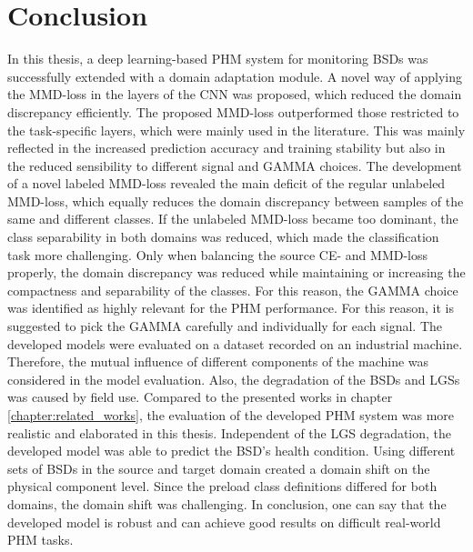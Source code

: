 \chapter{Conclusion}\label{chapter:conclusion}

In this thesis, a deep learning-based PHM system for monitoring BSDs was successfully extended with a domain adaptation module. A novel way of applying the MMD-loss in the layers of the CNN was proposed, which reduced the domain discrepancy efficiently. The proposed MMD-loss outperformed those restricted to the task-specific layers, which were mainly used in the literature. This was mainly reflected in the increased prediction accuracy and training stability but also in the reduced sensibility to different signal and GAMMA choices. The development of a novel labeled MMD-loss revealed the main deficit of the regular unlabeled MMD-loss, which equally reduces the domain discrepancy between samples of the same and different classes. If the unlabeled MMD-loss became too dominant, the class separability in both domains was reduced, which made the classification task more challenging. Only when balancing the source CE- and MMD-loss properly, the domain discrepancy was reduced while maintaining or increasing the compactness and separability of the classes. For this reason, the GAMMA choice was identified as highly relevant for the PHM performance. For this reason, it is suggested to pick the GAMMA carefully and individually for each signal. The developed models were evaluated on a dataset recorded on an industrial machine. Therefore, the mutual influence of different components of the machine was considered in the model evaluation. Also, the degradation of the BSDs and LGSs was caused by field use. Compared to the presented works in chapter \ref{chapter:related_works}, the evaluation of the developed PHM system was more realistic and elaborated in this thesis. Independent of the LGS degradation, the developed model was able to predict the BSD's health condition. Using different sets of BSDs in the source and target domain created a domain shift on the physical component level. Since the preload class definitions differed for both domains, the domain shift was challenging. In conclusion, one can say that the developed model is robust and can achieve good results on difficult real-world PHM tasks.